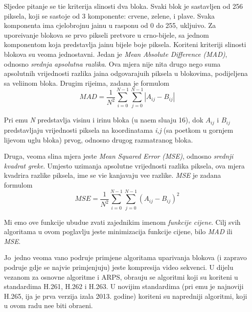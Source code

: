 Sljede\cj e pitanje se ti\ch e kriterija sli\ch nosti dva bloka. Svaki blok je sastavljen od 256 piksela, koji se sastoje od 3 komponente: crvene, zelene, i plave. Svaka komponenta ima cjelobrojnu ja\ch inu u rasponu od 0 do 255, uklju\ch ivo.
Za upore\dj ivanje blokova se prvo pikseli pretvore u crno-bijele, sa jednom komponentom koja predstavlja ja\ch inu bijele boje piksela.
Kori\sh teni kriteriji sli\ch nosti blokova su veoma jednostavni. Jedan je  \textit{Mean Absolute Difference (MAD)}, odnosno \textit{srednja apsolutna razlika}. Ova mjera nije ni\sh ta drugo nego suma apsolutnih vrijednosti razlika
ja\ch ina odgovaraju\cj ih piksela u blokovima, podijeljena sa veli\ch inom bloka. Drugim rije\ch ima, zadana je formulom
$$
MAD = \frac{1}{N^2}\sum_{i=0}^{N-1}\sum_{j=0}^{N-1}|A_{ij}-B_{ij}|
$$

Pri \ch emu \textit{N} predstavlja visinu i \sh irinu bloka (u na\sh em slu\ch aju 16), dok $A_{ij}$ i $B_{ij}$ predstavljaju vrijednosti piksela na koordinatama \textit{i,j} (sa po\ch etkom u gornjem lijevom uglu bloka) prvog,
odnosno drugog razmatranog bloka. 

Druga, veoma sli\ch na mjera jeste \textit{Mean Squared Error (MSE)}, odnosno \textit{srednji kvadrat gre\sh ke}. Umjesto uzimanja apsolutne vrijednosti razlika piksela, ova mjera kvadrira razlike piksela, \ch ime se vi\sh e
ka\zh njavaju ve\cj e razlike. \textit{MSE} je zadana formulom
$$
MSE = \frac{1}{N^2}\sum_{i=0}^{N-1}\sum_{j=0}^{N-1}(A_{ij}-B_{ij})^2
$$

Mi \cj emo ove funkcije ubudu\cj e zvati zajedni\ch kim imenom \textit{funkcije cijene}. Cilj svih algoritama u ovom poglavlju jeste minimizacija funkcije cijene, bilo \textit{MAD} ili \textit{MSE}.

Jo\sh\ jedno veoma va\zh no podru\ch je primjene algoritama uparivanja blokova (i zapravo podru\ch je gdje se najvi\sh e primjenjuju) jeste kompresija video sekvenci. U dijelu vezanom za osnovne algoritme i ARPS,
obra\dj uju se algoritmi koji su kori\sh teni u standardima H.261, H.262 i H.263. U novijim standardima (pri \ch emu je najnoviji H.265, \ch ija je prva verzija iza\sh la 2013. godine) kori\sh teni su napredniji algoritmi, koji u
ovom radu ne\cj e biti obra\dj eni.

